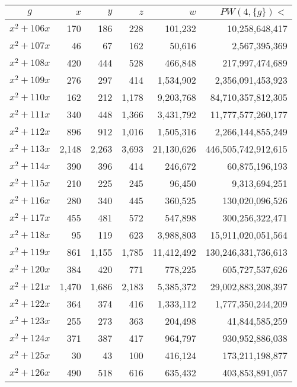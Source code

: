 \documentclass{article}
\begin{document}
\begin{center}
\begin{tabular}{ | c | r | r | r | r | r | }
$g$ & $x$ & $y$ & $z$ & $w$ & $PW(4, \{g\}) <$ \\ \hline
$x^2 + 106x$ & 170 & 186 & 228 & 101{,}232 & 10{,}258{,}648{,}417 \\ \hline
$x^2 + 107x$ & 46 & 67 & 162 & 50{,}616 & 2{,}567{,}395{,}369 \\ \hline
$x^2 + 108x$ & 420 & 444 & 528 & 466{,}848 & 217{,}997{,}474{,}689 \\ \hline
$x^2 + 109x$ & 276 & 297 & 414 & 1{,}534{,}902 & 2{,}356{,}091{,}453{,}923 \\ \hline
$x^2 + 110x$ & 162 & 212 & 1{,}178 & 9{,}203{,}768 & 84{,}710{,}357{,}812{,}305 \\ \hline
$x^2 + 111x$ & 340 & 448 & 1{,}366 & 3{,}431{,}792 & 11{,}777{,}577{,}260{,}177 \\ \hline
$x^2 + 112x$ & 896 & 912 & 1{,}016 & 1{,}505{,}316 & 2{,}266{,}144{,}855{,}249 \\ \hline
$x^2 + 113x$ & 2{,}148 & 2{,}263 & 3{,}693 & 21{,}130{,}626 & 446{,}505{,}742{,}912{,}615 \\ \hline
$x^2 + 114x$ & 390 & 396 & 414 & 246{,}672 & 60{,}875{,}196{,}193 \\ \hline
$x^2 + 115x$ & 210 & 225 & 245 & 96{,}450 & 9{,}313{,}694{,}251 \\ \hline
$x^2 + 116x$ & 280 & 340 & 445 & 360{,}525 & 130{,}020{,}096{,}526 \\ \hline
$x^2 + 117x$ & 455 & 481 & 572 & 547{,}898 & 300{,}256{,}322{,}471 \\ \hline
$x^2 + 118x$ & 95 & 119 & 623 & 3{,}988{,}803 & 15{,}911{,}020{,}051{,}564 \\ \hline
$x^2 + 119x$ & 861 & 1{,}155 & 1{,}785 & 11{,}412{,}492 & 130{,}246{,}331{,}736{,}613 \\ \hline
$x^2 + 120x$ & 384 & 420 & 771 & 778{,}225 & 605{,}727{,}537{,}626 \\ \hline
$x^2 + 121x$ & 1{,}470 & 1{,}686 & 2{,}183 & 5{,}385{,}372 & 29{,}002{,}883{,}208{,}397 \\ \hline
$x^2 + 122x$ & 364 & 374 & 416 & 1{,}333{,}112 & 1{,}777{,}350{,}244{,}209 \\ \hline
$x^2 + 123x$ & 255 & 273 & 363 & 204{,}498 & 41{,}844{,}585{,}259 \\ \hline
$x^2 + 124x$ & 371 & 387 & 417 & 964{,}797 & 930{,}952{,}886{,}038 \\ \hline
$x^2 + 125x$ & 30 & 43 & 100 & 416{,}124 & 173{,}211{,}198{,}877 \\ \hline
$x^2 + 126x$ & 490 & 518 & 616 & 635{,}432 & 403{,}853{,}891{,}057 \\ \hline

\end{tabular}
\end{center}
\end{document}

